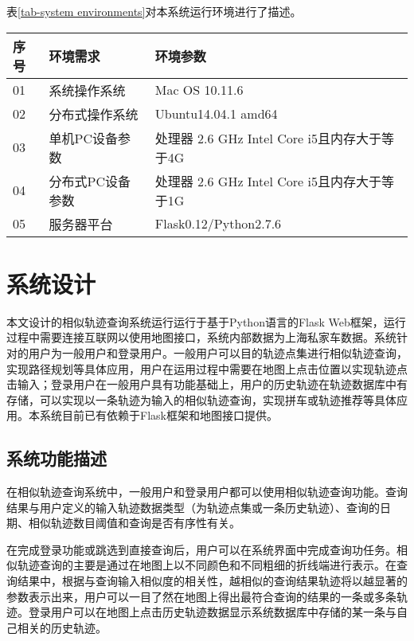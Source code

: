 表\ref{tab-system environments}对本系统运行环境进行了描述。
\begin{table}[!htpb]
  	\centering
		\begin{tabular}{ |p{1cm}|p{3.5cm}|p{8.5cm}| }
		\hline
		序号 & 环境需求 & 环境参数 \\
		\hline
		01 & 系统操作系统 & Mac OS 10.11.6  \\
		\hline
		02 & 分布式操作系统 & Ubuntu14.04.1 amd64  \\
		\hline
		03 & 单机PC设备参数 & 处理器 2.6 GHz Intel Core i5且内存大于等于4G\\
		\hline
		04 & 分布式PC设备参数 & 处理器 2.6 GHz Intel Core i5且内存大于等于1G\\
		\hline
		05 & 服务器平台 & Flask0.12/Python2.7.6 \\
		\hline
		\end{tabular}
\end{table}


\section{系统设计}
\label{sec:overall description}
本文设计的相似轨迹查询系统运行运行于基于Python语言的Flask Web框架，运行过程中需要连接互联网以使用地图接口，系统内部数据为上海私家车数据。系统针对的用户为一般用户和登录用户。一般用户可以目的轨迹点集进行相似轨迹查询，实现路径规划等具体应用，用户在运用过程中需要在地图上点击位置以实现轨迹点击输入；登录用户在一般用户具有功能基础上，用户的历史轨迹在轨迹数据库中有存储，可以实现以一条轨迹为输入的相似轨迹查询，实现拼车或轨迹推荐等具体应用。本系统目前已有依赖于Flask框架和地图接口提供。


\subsection{系统功能描述}
\label{subsec:product functions}
在相似轨迹查询系统中，一般用户和登录用户都可以使用相似轨迹查询功能。查询结果与用户定义的输入轨迹数据类型（为轨迹点集或一条历史轨迹）、查询的日期、相似轨迹数目阈值和查询是否有序性有关。

在完成登录功能或跳选到直接查询后，用户可以在系统界面中完成查询功任务。相似轨迹查询的主要是通过在地图上以不同颜色和不同粗细的折线端进行表示。在查询结果中，根据与查询输入相似度的相关性，越相似的查询结果轨迹将以越显著的参数表示出来，用户可以一目了然在地图上得出最符合查询的结果的一条或多条轨迹。登录用户可以在地图上点击历史轨迹数据显示系统数据库中存储的某一条与自己相关的历史轨迹。

